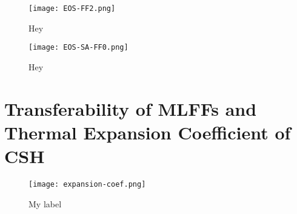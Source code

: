 \begin{figure}[h]
    \centering
    \texttt{[image: EOS-FF2.png]}
    \caption{Hey}
    \label{fig:eos-ff2}
\end{figure}

\begin{figure}[h]
    \centering
    \texttt{[image: EOS-SA-FF0.png]}
    \caption{Hey}
    \label{fig:eos-sa-ff0}
\end{figure}


\section{Transferability of MLFFs and Thermal Expansion Coefficient of CSH}


\begin{figure}[h]
    \centering
    \texttt{[image: expansion-coef.png]}
    \caption{
    My label
    }
    \label{expansion-coef}
\end{figure}






